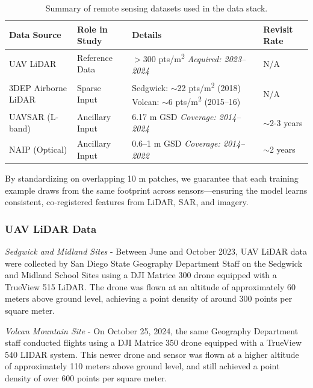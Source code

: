 \documentclass[remotesensing,article,submit,pdftex,moreauthors]{Definitions/mdpi}
\begin{document}
\begin{table}[H] %
\centering
\caption{Summary of remote sensing datasets used in the data stack.}
\label{tab:data_summary}
\begin{tabular}{l l p{4.5cm} l}
\toprule
\textbf{Data Source} & \textbf{Role in Study} & \textbf{Details} & \textbf{Revisit Rate} \\
\midrule
UAV LiDAR & Reference Data & $>$300 pts/m\textsuperscript{2} \newline \textit{Acquired: 2023--2024} & N/A \\
\addlinespace %
3DEP Airborne LiDAR & Sparse Input & Sedgwick: $\sim$22 pts/m\textsuperscript{2} (2018) \newline Volcan: $\sim$6 pts/m\textsuperscript{2} (2015–16) & N/A \\
\addlinespace
UAVSAR (L-band) & Ancillary Input & 6.17 m GSD \newline \textit{Coverage: 2014--2024} & $\sim$2-3 years \\
\addlinespace
NAIP (Optical) & Ancillary Input & 0.6–1 m GSD \newline \textit{Coverage: 2014--2022} & $\sim$2 years \\
\bottomrule
\end{tabular}
\end{table}

By standardizing on overlapping 10 m patches, we guarantee that each training example draws from the same footprint across sensors—ensuring the model learns consistent, co-registered features from LiDAR, SAR, and imagery.

\subsubsection{UAV LiDAR Data}
\textit{Sedgwick and Midland Sites} - Between June and October 2023, UAV LiDAR data were collected by San Diego State Geography Department Staff on the Sedgwick and Midland School Sites using a DJI Matrice 300 drone equipped with a TrueView 515 LiDAR. The drone was flown at an altitude of approximately 60 meters above ground level, achieving a point density of around 300 points per square meter. 

\textit{Volcan Mountain Site} - On October 25, 2024, the same Geography Department staff conducted flights using a  DJI Matrice 350 drone equipped with a TrueView 540 LIDAR system. This newer drone and sensor was flown at a higher altitude of approximately 110 meters above ground level, and still achieved a point density of over 600 points per square meter.
\end{document}
